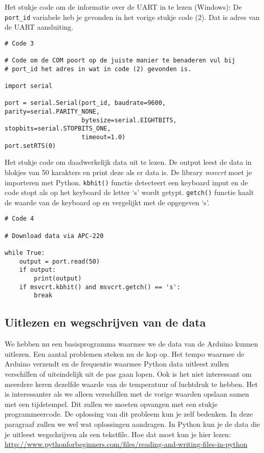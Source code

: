 Het stukje code om de informatie over de UART in te lezen (Windows):
De \verb|port_id| variabele heb je gevonden in het vorige stukje code (2).
Dat is adres van de UART aansluiting.

\begin{verbatim}
# Code 3

# Code om de COM poort op de juiste manier te benaderen vul bij
# port_id het adres in wat in code (2) gevonden is.

import serial

port = serial.Serial(port_id, baudrate=9600, parity=serial.PARITY_NONE,
                     bytesize=serial.EIGHTBITS, stopbits=serial.STOPBITS_ONE,
                     timeout=1.0)
port.setRTS(0)
\end{verbatim}

Het stukje code om daadwerkelijk data uit te lezen. De output leest de
data in blokjes van 50 karakters en print deze als er data is. De
library \emph{msvcrt} moet je importeren met Python. \verb|kbhit()|
functie detecteert een keyboard input en de code stopt als op het keyboard de
letter `s' wordt getypt. \verb|getch()| functie haalt de waarde van de keyboard
 op en vergelijkt met de opgegeven `s'.

\begin{verbatim}
# Code 4

# Download data via APC-220

while True:
    output = port.read(50)
    if output:
        print(output)
    if msvcrt.kbhit() and msvcrt.getch() == 's':
        break
\end{verbatim}


\subsection{Uitlezen en wegschrijven van de data}

We hebben nu een basisprogramma waarmee we de data van de Arduino kunnen
uitlezen. Een aantal problemen steken nu de kop op. Het tempo waarmee de
Arduino verzendt en de frequentie waarmee Python data uitleest zullen
verschillen of uiteindelijk uit de pas gaan lopen. Ook is het niet
interessant om meerdere keren dezelfde waarde van de temperatuur of
luchtdruk te hebben. Het is interessanter als we alleen verschillen met
de vorige waarden opslaan samen met een tijdstempel. Dit zullen we moeten opvangen met een stukje
programmeercode. De oplossing van dit probleem kun je zelf bedenken.
In deze paragraaf zullen we wel wat oplossingen aandragen.
In Python kun je de data die je uitleest wegschrijven als een tekstfile.
Hoe dat moet kun je hier lezen:
\url{http://www.pythonforbeginners.com/files/reading-and-writing-files-in-python}

